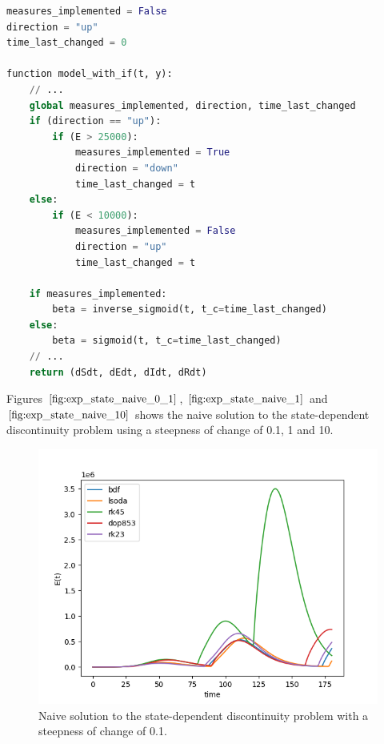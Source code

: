 \begin{minipage}{\linewidth}
\begin{lstlisting}[language=Python]
measures_implemented = False
direction = "up"
time_last_changed = 0

function model_with_if(t, y):
    // ...
    global measures_implemented, direction, time_last_changed
    if (direction == "up"):
        if (E > 25000):
            measures_implemented = True
            direction = "down"
            time_last_changed = t
    else:
        if (E < 10000):
            measures_implemented = False
            direction = "up"
            time_last_changed = t

    if measures_implemented:
        beta = inverse_sigmoid(t, t_c=time_last_changed)
    else:
        beta = sigmoid(t, t_c=time_last_changed)
    // ...
    return (dSdt, dEdt, dIdt, dRdt)
\end{lstlisting}
\end{minipage}

Figures $\ref{fig:exp_state_naive_0_1}$, $\ref{fig:exp_state_naive_1}$ and $\ref{fig:exp_state_naive_10}$ shows the naive solution to the state-dependent discontinuity problem using a steepness of change of 0.1, 1 and 10.

\begin{figure}[H]
\centering
\includegraphics[width=0.7\linewidth]{./figures/exp_state_naive_0_1}
\caption{Naive solution to the state-dependent discontinuity problem with a steepness of change of 0.1.}
\label{fig:exp_state_naive_0_1}
\end{figure}

